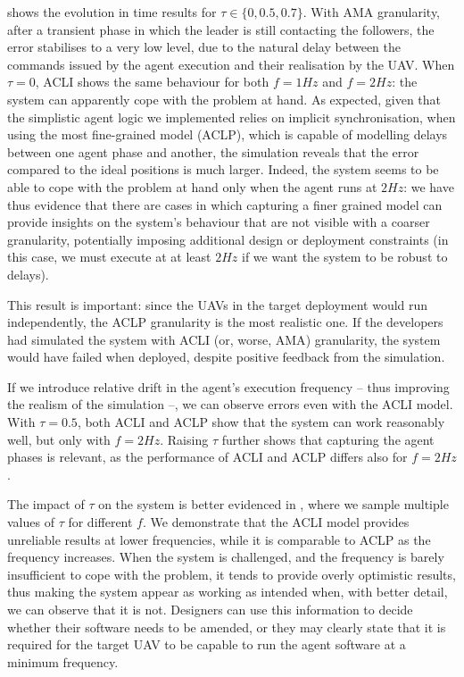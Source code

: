  shows the evolution in time results for $\tau \in \{0, 0.5, 0.7\}$.
%
With \ac{AMA} granularity,
after a transient phase in which the leader is still contacting the followers,
the error stabilises to a very low level,
due to the natural delay between the commands issued by the agent execution
and their realisation by the \ac{UAV}.
%
When $\tau=0$, \ac{ACLI} shows the same behaviour for both $f=1Hz$ and $f=2Hz$:
the system can apparently cope with the problem at hand.
%
As expected, given that the simplistic agent logic we implemented relies on implicit synchronisation,
when using the most fine-grained model (\ac{ACLP}),
which is capable of modelling delays between one agent phase and another,
the simulation reveals that the error compared to the ideal positions is much larger.
Indeed,
the system seems to be able to cope with the problem at hand only when the agent runs at $2Hz$:
we have thus evidence that there are cases in which capturing a finer grained model
can provide insights
on the system's behaviour
that are not visible with a coarser granularity,
potentially imposing additional design or deployment constraints
(in this case, we must execute at at least $2Hz$ if we want the system to be robust to delays).

This result is important:
since the \acp{UAV} in the target deployment would run independently,
the \ac{ACLP} granularity is the most realistic one.
%
If the developers had simulated the system with \ac{ACLI}
(or, worse, \ac{AMA}) granularity,
the system would have failed when deployed,
despite positive feedback from the simulation.


If we introduce relative drift in the agent's execution frequency
-- thus improving the realism of the simulation --,
we can observe errors even with the \ac{ACLI} model.
%
With $\tau=0.5$, both \ac{ACLI} and \ac{ACLP} show that the system can work reasonably well, but only with $f=2Hz$.
%
Raising $\tau$ further shows that capturing the agent phases is relevant,
as the performance of \ac{ACLI} and \ac{ACLP} differs also for $f=2Hz$.

The impact of $\tau$ on the system is better evidenced in ,
where we sample multiple values of $\tau$ for different $f$.
%
We
demonstrate that the \ac{ACLI} model provides unreliable results at lower frequencies,
while it is comparable to \ac{ACLP} as the frequency increases.
When the system is challenged, and the frequency is barely insufficient to cope with the problem,
it tends to provide overly optimistic results,
thus making the system appear as working as intended when, with better detail, we can observe that it is not.
%
Designers can use this information to decide whether their software needs to be amended,
or they may clearly state that it is required for the target \ac{UAV} to be capable to run the agent software
at a minimum frequency.

